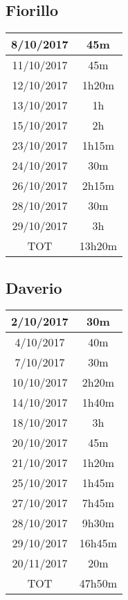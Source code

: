 
\subsection{Fiorillo}

\begin{tabular}{|c|c|}
	\hline
8/10/2017	& 45m \\ 
	\hline 
11/10/2017	& 45m \\ 
	\hline 
12/10/2017	& 1h20m \\ 
	\hline 
13/10/2017	& 1h \\ 
	\hline 
15/10/2017	& 2h \\ 
	\hline 
23/10/2017	& 1h15m \\ 
	\hline 
24/10/2017	& 30m \\ 
	\hline 
26/10/2017	& 2h15m \\ 
	\hline 
28/10/2017	& 30m \\ 
	\hline
29/10/2017	& 3h \\ 
	\hline
TOT			& 13h20m \\

\end{tabular} 

\subsection{Daverio}

\begin{tabular}{|c|c|}
	\hline
	2/10/2017	& 30m \\ 
	\hline 
	4/10/2017	& 40m \\ 
	\hline 
	7/10/2017	& 30m \\ 
	\hline 
	10/10/2017	& 2h20m \\ 
	\hline 
	14/10/2017	& 1h40m \\ 
	\hline 
	18/10/2017	& 3h \\ 
	\hline 
	20/10/2017	& 45m \\ 
	\hline 
	21/10/2017	& 1h20m \\ 
	\hline 
	25/10/2017	& 1h45m \\ 
	\hline 
	27/10/2017	& 7h45m \\ 
	\hline 
	28/10/2017	& 9h30m \\ 
	\hline
	29/10/2017	& 16h45m \\ 
	\hline
	20/11/2017	& 20m	\\
	\hline
	TOT			& 47h50m \\

\end{tabular}